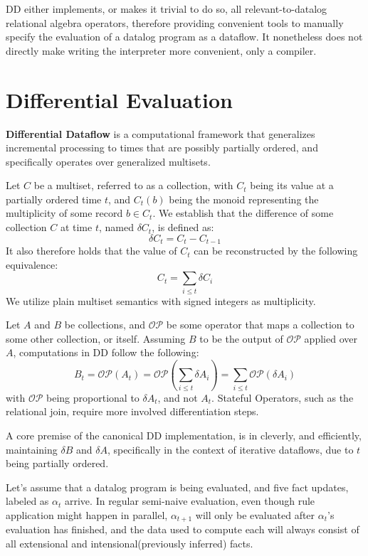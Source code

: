 \documentclass[sigconf,screen,review=false,natbib]{acmart}
\theoremstyle{definition}
\begin{document}
DD either implements, or makes it trivial to do so, all relevant-to-datalog relational algebra operators, therefore
providing convenient tools to manually specify the evaluation of a datalog program as a dataflow. It nonetheless does
not directly make writing the interpreter more convenient, only a compiler.
\section{Differential Evaluation}
\textbf{Differential Dataflow} is a computational framework that generalizes incremental processing to times that are
possibly partially ordered, and specifically operates over generalized multisets.

Let $C$ be a multiset, referred to as a collection, with $C_t$ being its value at a partially ordered time $t$, and
$C_t(b)$ being the monoid representing the multiplicity of some record $b \in C_t$. We establish that the difference of
some collection $C$ at time $t$, named $\delta C_t$, is defined as: \[\delta C_t = C_t - C_{t - 1}\] It also therefore
holds that the value of $C_t$ can be reconstructed by the following equivalence: \[C_t = \sum_{i \leq t}\delta C_{i}\]
We utilize plain multiset semantics with signed integers as multiplicity.

Let $A$ and $B$ be collections, and $\mathcal{OP}$ be some operator that maps a collection to some other
collection, or itself. Assuming $B$ to be the output of $\mathcal{OP}$ applied over $A$, computations in
DD follow the following: \[B_t = \mathcal{OP}(A_t) = \mathcal{OP}(\sum_{i \leq t} \delta A_i) = \sum_{i \leq t} \mathcal{OP}(\delta A_i)\]
with $\mathcal{OP}$ being proportional to $\delta A_t$, and not $A_t$. Stateful Operators, such as the
relational join, require more involved differentiation steps.

A core premise of the canonical DD implementation, is in cleverly, and efficiently, maintaining $\delta B$
and $\delta A$, specifically in the context of iterative dataflows, due to $t$ being partially ordered.

Let's assume that a datalog program is being evaluated, and five fact updates, labeled as $\alpha_t$ arrive. In
regular semi-naive evaluation, even though rule application might happen in parallel, $\alpha_{t + 1}$ will only be
evaluated after $\alpha_{t}$'s evaluation has finished, and the data used to compute each will always consist of all
extensional and intensional(previously inferred) facts.
\end{document}

